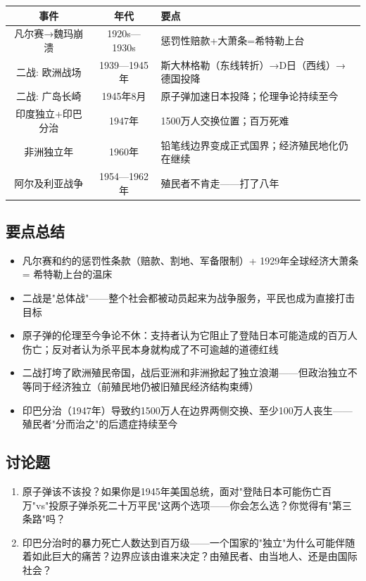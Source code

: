 \documentclass[a4paper,12pt]{ctexart}
\begin{document}
\begin{center}
\begin{tabular}{|c|c|p{7cm}|}
\hline
\textbf{事件} & \textbf{年代} & \textbf{要点} \\
\hline
凡尔赛→魏玛崩溃 & 1920s—1930s & 惩罚性赔款+大萧条=希特勒上台 \\
\hline
二战: 欧洲战场 & 1939—1945年 & 斯大林格勒（东线转折）→D日（西线）→德国投降 \\
\hline
二战: 广岛长崎 & 1945年8月 & 原子弹加速日本投降；伦理争论持续至今 \\
\hline
印度独立+印巴分治 & 1947年 & 1500万人交换位置；百万死难 \\
\hline
非洲独立年 & 1960年 & 铅笔线边界变成正式国界；经济殖民地化仍在继续 \\
\hline
阿尔及利亚战争 & 1954—1962年 & 殖民者不肯走——打了八年 \\
\hline
\end{tabular}
\end{center}

\subsection*{要点总结}
\begin{itemize}
  \item 凡尔赛和约的惩罚性条款（赔款、割地、军备限制）+ 1929年全球经济大萧条 = 希特勒上台的温床
  \item 二战是"总体战"——整个社会都被动员起来为战争服务，平民也成为直接打击目标
  \item 原子弹的伦理至今争论不休：支持者认为它阻止了登陆日本可能造成的百万人伤亡；反对者认为杀平民本身就构成了不可逾越的道德红线
  \item 二战打垮了欧洲殖民帝国，战后亚洲和非洲掀起了独立浪潮——但政治独立不等同于经济独立（前殖民地仍被旧殖民经济结构束缚）
  \item 印巴分治（1947年）导致约1500万人在边界两侧交换、至少100万人丧生——殖民者"分而治之"的后遗症持续至今
\end{itemize}

\subsection*{讨论题}
\begin{enumerate}
  \item 原子弹该不该投？如果你是1945年美国总统，面对"登陆日本可能伤亡百万"vs"投原子弹杀死二十万平民"这两个选项——你会怎么选？你觉得有"第三条路"吗？
  \item 印巴分治时的暴力死亡人数达到百万级——一个国家的"独立"为什么可能伴随着如此巨大的痛苦？边界应该由谁来决定？由殖民者、由当地人、还是由国际社会？
\end{enumerate}
\end{document}
